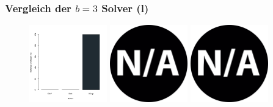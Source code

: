 \documentclass{beamer}
\begin{document}
\begin{frame}
\frametitle{Vergleich der $b = 3$ Solver (l)}

\begin{figure}
\centering
\includegraphics[width=0.3\textwidth]{images/solver_instance_coverage_b=3_l_1800s.png}
\includegraphics[width=0.3\textwidth]{images/na.png}
\includegraphics[width=0.3\textwidth]{images/na.png}
\caption*{\textsc{Zeitlimit} $30min$ $\quad\quad\quad$ \textsc{Zeitlimit} $45min$ $\quad\quad\quad$ \textsc{Zeitlimit} $60min$}
\begin{subfigure}[b]{0.3\textwidth}
\centering
{}

\end{subfigure}
\end{figure}
\end{frame}
\end{document}
